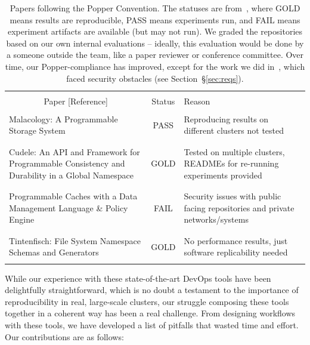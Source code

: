 \begin{table}[t]
\centering
\normalsize
\begin{tabular}{ >{}m{3.2in} | c | >{}m{2.9in} }
&\\
\multicolumn{1}{c|}{Paper [Reference]} & Status & Reason\\ \hline
&\\
Malacology: A Programmable Storage System~\cite{sevilla:eurosys17-malacology}
& PASS
& Reproducing results on different clusters not tested\\ 
&\\\hdashline
&\\
Cudele: An API and Framework for Programmable Consistency and Durability in a Global Namespace~\cite{sevilla:ipdps18-cudele}
& GOLD 
& Tested on multiple clusters, READMEs for re-running experiments provided\\
&\\\hdashline
&\\
Programmable Caches with a Data Management Language \& Policy Engine~\cite{sevilla:ccgrid18-parsplice}
& FAIL 
& Security issues with public facing repositories and private networks/systems\\
&\\\hdashline
&\\
Tintenfisch: File System Namespace Schemas and Generators~\cite{sevilla:techreport18-tintenfisch}
& GOLD 
& No performance results, just software replicability needed\\
&\\
\end{tabular}

\caption{Papers following the Popper Convention. The statuses are
from~\cite{jimenez:rr18-popper}, where GOLD means results are reproducible,
PASS means experiments run, and FAIL means experiment artifacts are available
(but may not run). We graded the repositories based on our own internal
evaluations -- ideally, this evaluation would be done by a someone outside the
team, like a paper reviewer or conference committee. Over time, our
Popper-compliance has improved, except for the work we did
in~\cite{sevilla:ccgrid18-parsplice}, which faced security obstacles (see
Section~\S\ref{sec:reqs}).}

\label{table:papers}
\end{table}

While our experience with these state-of-the-art
DevOps tools have been delightfully straightforward, which is no doubt a
testament to the importance of reproducibility in real, large-scale clusters,
our struggle composing these tools together in a coherent way has been a real
challenge.  From designing workflows with these tools, we have developed a list
of pitfalls that wasted time and effort. Our contributions are as follows:

